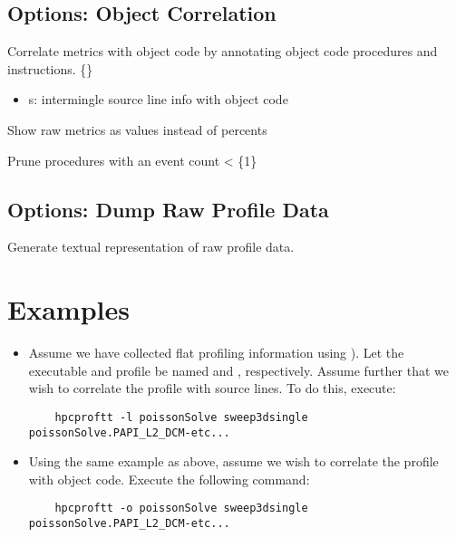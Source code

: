 \documentclass[english]{article}
\begin{document}
\subsection{Options: Object Correlation}

\begin{Description}

\item[\OptoArg{--object}{=s}] 
\item[\OptoArg{--obj}{=s}] 
Correlate metrics with object code by annotating object code procedures and instructions. \{\}
  \begin{itemize}
  \item s: intermingle source line info with object code
  \end{itemize}

\item[\Opt{--obj-values}] 
Show raw metrics as values instead of percents

\item[\OptArg{--obj-threshold}{n}] 
Prune procedures with an event count <  \{1\}

\end{Description}

\subsection{Options: Dump Raw Profile Data}

\begin{Description}
\item[\Opt{--dump}] Generate textual representation of raw profile data.
\end{Description}


\section{Examples}

\begin{itemize}

\item Assume we have collected flat profiling information using  ).
Let the executable and profile be named  and , respectively.
Assume further that we wish to correlate the profile with source lines.
To do this, execute:
\begin{verbatim}
    hpcproftt -l poissonSolve sweep3dsingle poissonSolve.PAPI_L2_DCM-etc...
\end{verbatim}

\item Using the same example as above, assume we wish to correlate the profile with object code.  Execute the following command:
\begin{verbatim}
    hpcproftt -o poissonSolve sweep3dsingle poissonSolve.PAPI_L2_DCM-etc...
\end{verbatim}

\end{itemize}
\end{document}
